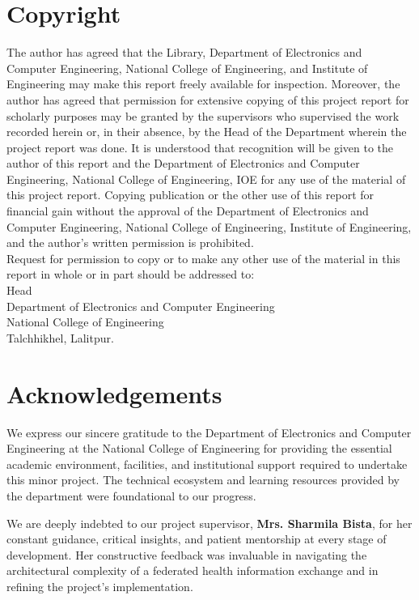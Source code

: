 \documentclass[12pt]{report}
\numberwithin{equation}{chapter}
\begin{document}
\chapter*{Copyright}
The author has agreed that the Library, Department of Electronics and Computer Engineering, National College of Engineering, and Institute of Engineering may make this report freely available for inspection. Moreover, the author has agreed that permission for extensive copying of this project report for scholarly purposes may be granted by the supervisors who supervised the work recorded herein or, in their absence, by the Head of the Department wherein the project report was done. It is understood that recognition will be given to the author of this report and the Department of Electronics and Computer Engineering, National College of Engineering, IOE for any use of the material of this project report. Copying publication or the other use of this report for financial gain without the approval of the Department of Electronics and Computer Engineering, National College of Engineering, Institute of Engineering, and the author's written permission is prohibited.\\
Request for permission to copy or to make any other use of the material in this report in whole or in part should be addressed to:\\
\newline
\newline
\newline
Head\\
Department of Electronics and Computer Engineering\\
National College of Engineering\\
Talchhikhel, Lalitpur.

\chapter*{Acknowledgements}
We express our sincere gratitude to the Department of Electronics and Computer Engineering at the National College of Engineering for providing the essential academic environment, facilities, and institutional support required to undertake this minor project. The technical ecosystem and learning resources provided by the department were foundational to our progress.

We are deeply indebted to our project supervisor, \textbf{Mrs. Sharmila Bista}, for her constant guidance, critical insights, and patient mentorship at every stage of development. Her constructive feedback was invaluable in navigating the architectural complexity of a federated health information exchange and in refining the project's implementation.
\end{document}

